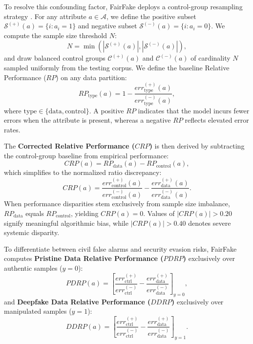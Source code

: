 \documentclass[journal]{IEEEtran}
\begin{document}
To resolve this confounding factor, FairFake deploys a control-group resampling strategy \cite{terhorst2022comprehensive, xu2024analyzing}. For any attribute $a \in \mathcal{A}$, we define the positive subset $\mathcal{S}^{(+)}(a) = \{i : a_i = 1\}$ and negative subset $\mathcal{S}^{(-)}(a) = \{i : a_i = 0\}$. We compute the sample size threshold $N$:
\begin{equation}
    N = \min\left(|\mathcal{S}^{(+)}(a)|, |\mathcal{S}^{(-)}(a)|\right),
\end{equation}
and draw balanced control groups $\mathcal{C}^{(+)}(a)$ and $\mathcal{C}^{(-)}(a)$ of cardinality $N$ sampled uniformly from the testing corpus. We define the baseline Relative Performance ($RP$) on any data partition:
\begin{equation}
    RP_{\text{type}}(a) = 1 - \frac{err_{\text{type}}^{(+)}(a)}{err_{\text{type}}^{(-)}(a)},
    \label{eq:rp}
\end{equation}
where $\text{type} \in \{\text{data}, \text{control}\}$. A positive $RP$ indicates that the model incurs fewer errors when the attribute is present, whereas a negative $RP$ reflects elevated error rates.

The \textbf{Corrected Relative Performance ($CRP$)} is then derived by subtracting the control-group baseline from empirical performance:
\begin{equation}
    CRP(a) = RP_{\text{data}}(a) - RP_{\text{control}}(a),
    \label{eq:crp}
\end{equation}
which simplifies to the normalized ratio discrepancy:
\begin{equation}
    CRP(a) = \frac{err_{\text{control}}^{(+)}(a)}{err_{\text{control}}^{(-)}(a)} - \frac{err_{\text{data}}^{(+)}(a)}{err_{\text{data}}^{(-)}(a)}.
    \label{eq:crp_expanded}
\end{equation}
When performance disparities stem exclusively from sample size imbalance, $RP_{\text{data}}$ equals $RP_{\text{control}}$, yielding $CRP(a) = 0$. Values of $|CRP(a)| > 0.20$ signify meaningful algorithmic bias, while $|CRP(a)| > 0.40$ denotes severe systemic disparity.

To differentiate between civil false alarms and security evasion risks, FairFake computes \textbf{Pristine Data Relative Performance ($PDRP$)} exclusively over authentic samples ($y = 0$):
\begin{equation}
    PDRP(a) = \left[ \frac{err_{\text{ctrl}}^{(+)}}{err_{\text{ctrl}}^{(-)}} - \frac{err_{\text{data}}^{(+)}}{err_{\text{data}}^{(-)}} \right]_{y=0},
\end{equation}
and \textbf{Deepfake Data Relative Performance ($DDRP$)} exclusively over manipulated samples ($y = 1$):
\begin{equation}
    DDRP(a) = \left[ \frac{err_{\text{ctrl}}^{(+)}}{err_{\text{ctrl}}^{(-)}} - \frac{err_{\text{data}}^{(+)}}{err_{\text{data}}^{(-)}} \right]_{y=1}.
\end{equation}
\end{document}
